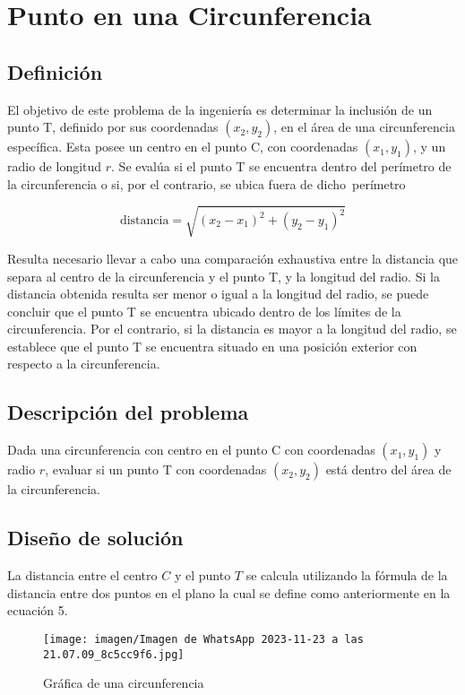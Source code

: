 \section{Punto en una Circunferencia}

\subsection{Definición}
El objetivo de este problema de la ingeniería es determinar la inclusión de un punto T, definido por sus coordenadas $(x_2, y_2)$, en el área de una circunferencia específica. Esta posee un centro en el punto C, con coordenadas $(x_1, y_1)$, y un radio de longitud $r$. Se evalúa si el punto T se encuentra dentro del perímetro de la circunferencia o si, por el contrario, se ubica fuera de dicho perímetro

\begin{equation}
\text{distancia} = \sqrt{(x_2 - x_1)^2 + (y_2 - y_1)^2}
\end{equation}

Resulta necesario llevar a cabo una comparación exhaustiva entre la distancia que separa al centro de la circunferencia y el punto T, y la longitud del radio. Si la distancia obtenida resulta ser menor o igual a la longitud del radio, se puede concluir que el punto T se encuentra ubicado dentro de los límites de la circunferencia. Por el contrario, si la distancia es mayor a la longitud del radio, se establece que el punto T se encuentra situado en una posición exterior con respecto a la circunferencia.

\subsection{Descripción del problema}

Dada una circunferencia con centro en el punto C con coordenadas $(x_1, y_1)$ y radio $r$, evaluar si un punto T con coordenadas $(x_2, y_2)$ está dentro del área de la circunferencia.

\subsection{Diseño de solución}

La distancia entre el centro $C$ y el punto $T$ se calcula utilizando la fórmula de la distancia entre dos puntos en el plano la cual se define como anteriormente en la ecuación 5.

 \begin{figure}[h!]
\centering
\texttt{[image: imagen/Imagen de WhatsApp 2023-11-23 a las 21.07.09\_8c5cc9f6.jpg]}
\caption{Gráfica de una circunferencia}
\label{fig:grafica}
\end{figure}

